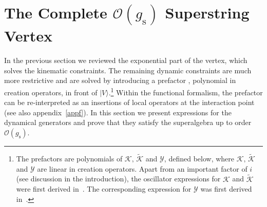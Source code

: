 \documentclass[12pt]{article}
\def\mc{\mathcal}
\def\ra{\rangle}
\def\wt{\widetilde}
\numberwithin{equation}{section} \setlength{\textwidth}{17cm}
\begin{document}
\section{The Complete ${\mc O}(g_{\text{s}})$ Superstring Vertex}\label{sec4}
In the previous section we reviewed the exponential part of the vertex, which solves the kinematic constraints.
The remaining dynamic constraints are much more restrictive and are solved by 
introducing a prefactor \cite{gs,gsb}, polynomial in creation operators, in front of $|V\ra$.\footnote{The prefactors 
are polynomials of ${\mc K},\,{\wt{\mc K}}$ and ${\mc Y}$, defined below,
where ${\mc K},\,{\wt{\mc K}}$ and ${\mc Y}$ are linear in creation operators. Apart from
an important factor of $i$ (see discussion in the introduction),
the oscillator expressions for ${\mc K}$ and ${\wt{\mc K}}$ were first
derived in~\cite{sv2}. The corresponding expression for ${\mc Y}$ was first derived
in~\cite{ap}.}
Within the functional formalism, the prefactor can be re-interpreted as an insertions of local operators
at the interaction point~\cite{Mandsusy,gs} (see also appendix~\ref{appf}).
In this section we present expressions for the dynamical generators
and prove that they satisfy the superalgebra up to order ${\mc O}(g_{\text{s}})$.
\end{document}

